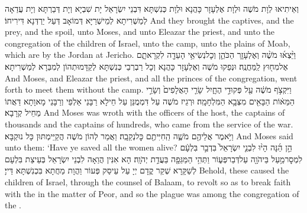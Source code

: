 {וְאֵיתִיאוּ לְוָת מֹשֶׁה וּלְוָת אֶלְעָזָר כָּהֲנָא וּלְוָת כְּנִשְׁתָּא דִּבְנֵי יִשְׂרָאֵל יָת שִׁבְיָא וְיָת דְּבַרְתָּא וְיָת עֲדַאָה לְמַשְׁרִיתָא לְמֵישְׁרַיָּא דְּמוֹאָב דְּעַל יַרְדְּנָא דִּירִיחוֹ׃}
{And they brought the captives, and the prey, and the spoil, unto Moses, and unto Eleazar the priest, and unto the congregation of the children of Israel, unto the camp, unto the plains of Moab, which are by the Jordan at Jericho.}{}
{וַיֵּ֨צְא֜וּ מֹשֶׁ֨ה וְאֶלְעָזָ֧ר הַכֹּהֵ֛ן וְכׇל\maqqaf נְשִׂיאֵ֥י הָעֵדָ֖ה לִקְרָאתָ֑ם אֶל\maqqaf מִח֖וּץ לַֽמַּחֲנֶֽה׃}
{וּנְפַקוּ מֹשֶׁה וְאֶלְעָזָר כָּהֲנָא וְכָל רַבְרְבֵי כְּנִשְׁתָּא לְקַדָּמוּתְהוֹן לְמִבַּרָא לְמַשְׁרִיתָא׃}
{And Moses, and Eleazar the priest, and all the princes of the congregation, went forth to meet them without the camp.}{}
{וַיִּקְצֹ֣ף מֹשֶׁ֔ה עַ֖ל פְּקוּדֵ֣י הֶחָ֑יִל שָׂרֵ֤י הָאֲלָפִים֙ וְשָׂרֵ֣י הַמֵּא֔וֹת הַבָּאִ֖ים מִצְּבָ֥א הַמִּלְחָמָֽה׃}
{וּרְגֵיז מֹשֶׁה עַל דִּמְמֻנַּן עַל חֵילָא רַבָּנֵי אַלְפֵי וְרַבָּנֵי מָאוָתָא דַּאֲתוֹ מֵחֵיל קְרָבָא׃}
{And Moses was wroth with the officers of the host, the captains of thousands and the captains of hundreds, who came from the service of the war.}{}
{וַיֹּ֥אמֶר אֲלֵיהֶ֖ם מֹשֶׁ֑ה הַֽחִיִּיתֶ֖ם כׇּל\maqqaf נְקֵבָֽה׃}
{וַאֲמַר לְהוֹן מֹשֶׁה הֲקַיֵּימְתּוּן כָּל נוּקְבָּא׃}
{And Moses said unto them: ‘Have ye saved all the women alive?}{}
{הֵ֣ן הֵ֜נָּה הָי֨וּ לִבְנֵ֤י יִשְׂרָאֵל֙ בִּדְבַ֣ר בִּלְעָ֔ם לִמְסׇר\maqqaf מַ֥עַל בַּיהֹוָ֖ה עַל\maqqaf דְּבַר\maqqaf פְּע֑וֹר וַתְּהִ֥י הַמַּגֵּפָ֖ה בַּעֲדַ֥ת יְהֹוָֽה׃}
{הָא אִנִּין הֲוַאָה לִבְנֵי יִשְׂרָאֵל בְּעֵיצַת בִּלְעָם לְשַׁקָּרָא שְׁקַר קֳדָם יְיָ עַל עֵיסַק פְּעוֹר וַהֲוָת מַחֲתָא בִּכְנִשְׁתָּא דַּייָ׃}
{Behold, these caused the children of Israel, through the counsel of Balaam, to revolt so as to break faith with the \lord\space in the matter of Peor, and so the plague was among the congregation of the \lord.}{}
